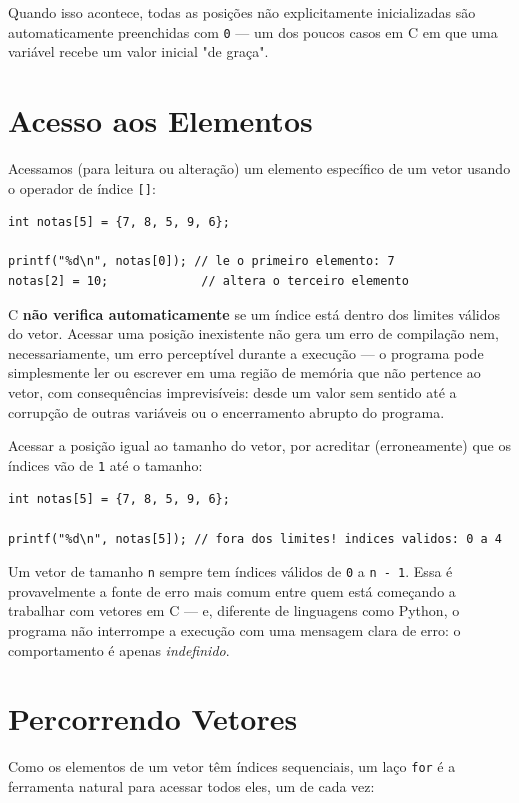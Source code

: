 \documentclass[12pt,a4paper,oneside]{extreport}
\begin{document}
Quando isso acontece, todas as posições não explicitamente inicializadas são automaticamente preenchidas com \texttt{0} — um dos poucos casos em C em que uma variável recebe um valor inicial "de graça".

\section{Acesso aos Elementos}

Acessamos (para leitura ou alteração) um elemento específico de um vetor usando o operador de índice \texttt{[]}:

\begin{lstlisting}
int notas[5] = {7, 8, 5, 9, 6};

printf("%d\n", notas[0]); // le o primeiro elemento: 7
notas[2] = 10;             // altera o terceiro elemento
\end{lstlisting}

C \textbf{não verifica automaticamente} se um índice está dentro dos limites válidos do vetor. Acessar uma posição inexistente não gera um erro de compilação nem, necessariamente, um erro perceptível durante a execução — o programa pode simplesmente ler ou escrever em uma região de memória que não pertence ao vetor, com consequências imprevisíveis: desde um valor sem sentido até a corrupção de outras variáveis ou o encerramento abrupto do programa.

\begin{errocomum}
Acessar a posição igual ao tamanho do vetor, por acreditar (erroneamente) que os índices vão de \texttt{1} até o tamanho:
\begin{lstlisting}
int notas[5] = {7, 8, 5, 9, 6};

printf("%d\n", notas[5]); // fora dos limites! indices validos: 0 a 4
\end{lstlisting}
Um vetor de tamanho \texttt{n} sempre tem índices válidos de \texttt{0} a \texttt{n - 1}. Essa é provavelmente a fonte de erro mais comum entre quem está começando a trabalhar com vetores em C — e, diferente de linguagens como Python, o programa não interrompe a execução com uma mensagem clara de erro: o comportamento é apenas \textit{indefinido}.
\end{errocomum}

\section{Percorrendo Vetores}

Como os elementos de um vetor têm índices sequenciais, um laço \texttt{for} é a ferramenta natural para acessar todos eles, um de cada vez:
\end{document}
